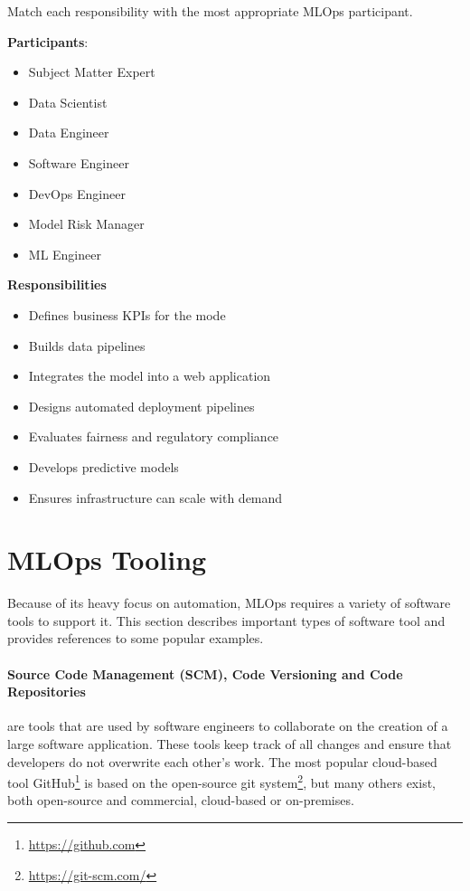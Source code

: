 \begin{exerciseboxpaper}
\small
Match each responsibility with the most appropriate MLOps participant.

\bigskip
\begin{minipage}[t]{.35\textwidth}
{\bf Participants}:
\begin{itemize}
    \item Subject Matter Expert
    \item Data Scientist
    \item Data Engineer
    \item Software Engineer
    \item DevOps Engineer
    \item Model Risk Manager
    \item ML Engineer
\end{itemize}
\end{minipage}
\begin{minipage}[t]{.64\textwidth}
{\bf Responsibilities}
\begin{itemize}
   \item Defines business KPIs for the mode
   \item Builds data pipelines
   \item Integrates the model into a web application
   \item Designs automated deployment pipelines
   \item Evaluates fairness and regulatory compliance 
   \item Develops predictive models
   \item Ensures infrastructure can scale with demand 
\end{itemize}
\end{minipage}
\end{exerciseboxpaper}

\section{MLOps Tooling}

Because of its heavy focus on automation, MLOps requires a variety of software tools to support it. This section describes important types of software tool and provides references to some popular examples.

\paragraph*{Source Code Management (SCM), Code Versioning and Code Repositories} are tools that are used by software engineers to collaborate on the creation of a large software application. These tools keep track of all changes and ensure that developers do not overwrite each other's work. The most popular cloud-based tool GitHub\footnote{\url{https://github.com}} is based on the open-source git system\footnote{\url{https://git-scm.com/}}, but many others exist, both open-source and commercial, cloud-based or on-premises. 

